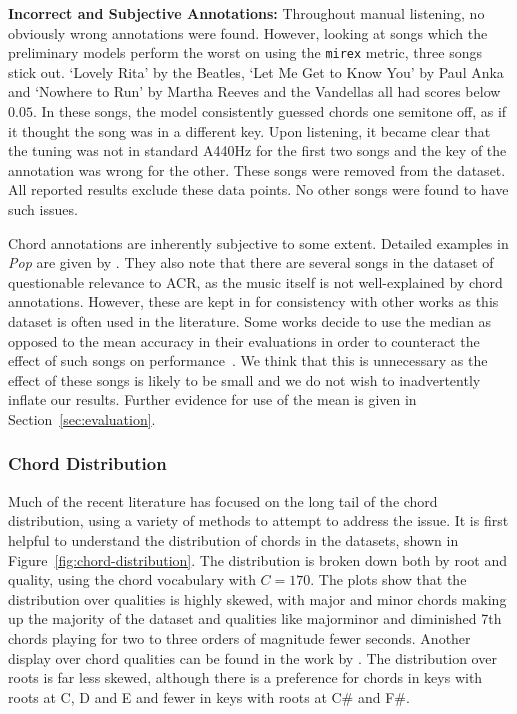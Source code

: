 \textbf{Incorrect and Subjective Annotations:} Throughout manual listening, no obviously wrong annotations were found. However, looking at songs which the preliminary models perform the worst on using the \texttt{mirex} metric, three songs stick out. `Lovely Rita' by the Beatles, `Let Me Get to Know You' by Paul Anka and `Nowhere to Run' by Martha Reeves and the Vandellas all had scores below $0.05$. In these songs, the model consistently guessed chords one semitone off, as if it thought the song was in a different key. Upon listening, it became clear that the tuning was not in standard A440Hz for the first two songs and the key of the annotation was wrong for the other. These songs were removed from the dataset. All reported results exclude these data points. No other songs were found to have such issues.

Chord annotations are inherently subjective to some extent. Detailed examples in \emph{Pop} are given by \citet{FourTimelyInsights}. They also note that there are several songs in the dataset of questionable relevance to ACR, as the music itself is not well-explained by chord annotations. However, these are kept in for consistency with other works as this dataset is often used in the literature. Some works decide to use the median as opposed to the mean accuracy in their evaluations in order to counteract the effect of such songs on performance~\citep{StructuredTraining}. We think that this is unnecessary as the effect of these songs is likely to be small and we do not wish to inadvertently inflate our results. Further evidence for use of the mean is given in Section~\ref{sec:evaluation}.

\subsubsection{Chord Distribution}

Much of the recent literature has focused on the long tail of the chord distribution, using a variety of methods to attempt to address the issue. It is first helpful to understand the distribution of chords in the datasets, shown in Figure~\ref{fig:chord-distribution}. The distribution is broken down both by root and quality, using the chord vocabulary with $C=170$. The plots show that the distribution over qualities is highly skewed, with major and minor chords making up the majority of the dataset and qualities like majorminor and diminished 7th chords playing for two to three orders of magnitude fewer seconds. Another display over chord qualities can be found in the work by \citet{ACRLargeVocab1}. The distribution over roots is far less skewed, although there is a preference for chords in keys with roots at C, D and E and fewer in keys with roots at C\# and F\#.

